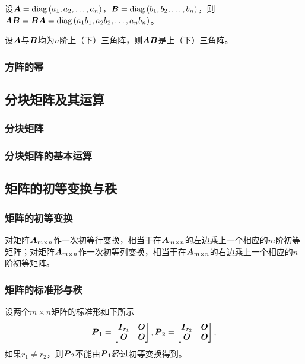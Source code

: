 \documentclass{ctexart}
\begin{document}
\begin{property}
    设\(\boldsymbol{A}=\mathrm{diag}\left( a_1,a_2,\dots,a_n \right)\)，\(\boldsymbol{B}=\mathrm{diag}\left( b_1,b_2,\dots,b_n \right)\)，则\(\boldsymbol{A}\boldsymbol{B}=\boldsymbol{B}\boldsymbol{A}=\mathrm{diag}\left( a_1b_1,a_2b_2,\dots,a_nb_n \right)\)。
\end{property}

\begin{property}
    设\(\boldsymbol{A}\)与\(\boldsymbol{B}\)均为\(n\)阶上（下）三角阵，则\(\boldsymbol{A}\boldsymbol{B}\)是上（下）三角阵。
\end{property}

\subsubsection*{方阵的幂}

\subsection{分块矩阵及其运算}

\subsubsection*{分块矩阵}

\subsubsection*{分块矩阵的基本运算}

\subsection{矩阵的初等变换与秩}

\subsubsection*{矩阵的初等变换}

\begin{theorem}
    对矩阵\(\boldsymbol{A}_{m\times n}\)作一次初等行变换，相当于在\(\boldsymbol{A}_{m\times n}\)的左边乘上一个相应的\(m\)阶初等矩阵；对矩阵\(\boldsymbol{A}_{m\times n}\)作一次初等列变换，相当于在\(\boldsymbol{A}_{m\times n}\)的右边乘上一个相应的\(n\)阶初等矩阵。
\end{theorem}

\subsubsection*{矩阵的标准形与秩}

\begin{lemma}
    设两个\(m\times n\)矩阵的标准形如下所示
    \begin{equation*}
        \boldsymbol{P}_1=\begin{bmatrix}
            \boldsymbol{I}_{r_1} & \boldsymbol{O} \\\boldsymbol{O}&\boldsymbol{O}
        \end{bmatrix},
        \boldsymbol{P}_2=\begin{bmatrix}
            \boldsymbol{I}_{r_2} & \boldsymbol{O} \\\boldsymbol{O}&\boldsymbol{O}
        \end{bmatrix},
    \end{equation*}
    如果\(r_1\neq r_2\)，则\(\boldsymbol{P}_2\)不能由\(\boldsymbol{P}_1\)经过初等变换得到。
\end{lemma}
\end{document}
